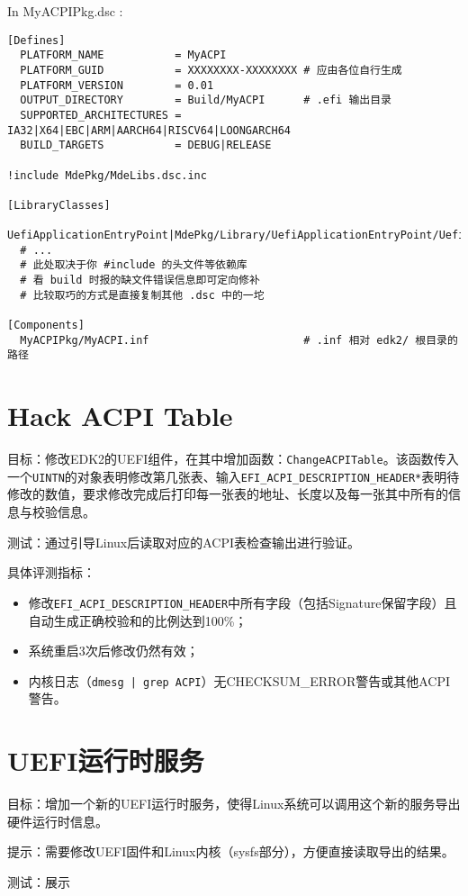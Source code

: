 In MyACPIPkg.dsc :

\begin{lstlisting}
[Defines]
  PLATFORM_NAME           = MyACPI
  PLATFORM_GUID           = XXXXXXXX-XXXXXXXX # 应由各位自行生成
  PLATFORM_VERSION        = 0.01
  OUTPUT_DIRECTORY        = Build/MyACPI      # .efi 输出目录
  SUPPORTED_ARCHITECTURES = IA32|X64|EBC|ARM|AARCH64|RISCV64|LOONGARCH64
  BUILD_TARGETS           = DEBUG|RELEASE

!include MdePkg/MdeLibs.dsc.inc
  
[LibraryClasses]
  UefiApplicationEntryPoint|MdePkg/Library/UefiApplicationEntryPoint/UefiApplicationEntryPoint.inf
  # ...
  # 此处取决于你 #include 的头文件等依赖库
  # 看 build 时报的缺文件错误信息即可定向修补
  # 比较取巧的方式是直接复制其他 .dsc 中的一坨
  
[Components]
  MyACPIPkg/MyACPI.inf                        # .inf 相对 edk2/ 根目录的路径
\end{lstlisting}

\section{Hack ACPI Table}
目标：修改EDK2的UEFI组件，在其中增加函数：\texttt{ChangeACPITable}。该函数传入一个\texttt{UINTN}的对象表明修改第几张表、输入\texttt{EFI\_ACPI\_DESCRIPTION\_HEADER*}表明待修改的数值，要求修改完成后打印每一张表的地址、长度以及每一张其中所有的信息与校验信息。

测试：通过引导Linux后读取对应的ACPI表检查输出进行验证。

具体评测指标：
\begin{itemize}
\item 修改\texttt{EFI\_ACPI\_DESCRIPTION\_HEADER}中所有字段（包括Signature保留字段）且自动生成正确校验和的比例达到100\%；
\item 系统重启3次后修改仍然有效；
\item 内核日志（\texttt{dmesg | grep ACPI}）无CHECKSUM\_ERROR警告或其他ACPI警告。
\end{itemize}

\section{UEFI运行时服务}
目标：增加一个新的UEFI运行时服务，使得Linux系统可以调用这个新的服务导出硬件运行时信息。

提示：需要修改UEFI固件和Linux内核（sysfs部分），方便直接读取导出的结果。

测试：展示
